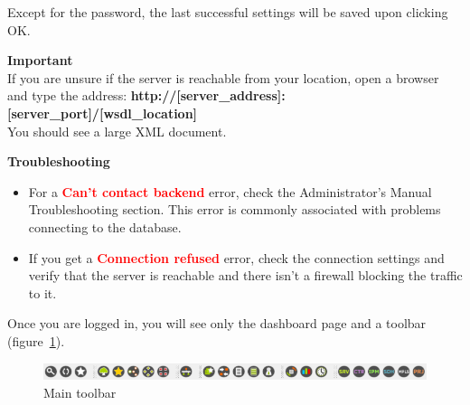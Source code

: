 \documentclass[a4paper]{article}
\begin{document}
	Except for the password, the last successful settings will be saved upon clicking OK.
	\begin{framed} {\large \textbf{Important}} \\
		If you are unsure if the server is reachable from your location, open a browser and type the address: \textbf{http://[server\_address]:[server\_port]/[wsdl\_location]}\\
		
		You should see a large XML document.
	\end{framed}
	\begin{framed} {\large \textbf{Troubleshooting}}
		\begin{itemize}
			\item For a \textbf{\textcolor{red}{Can't contact backend}} error, check the Administrator's Manual Troubleshooting section. This error is commonly associated with problems connecting to the database.
			\item If you get a \textbf{\textcolor{red}{Connection refused}} error, check the connection settings and verify that the server is reachable and there isn't a firewall blocking the traffic to it.
		\end{itemize}
	\end{framed} 
	Once you are logged in, you will see only the dashboard page and a toolbar (figure~\ref{fig:main_toolbar}).\\
	\begin{figure}[h!]
		\centering
		\includegraphics[width=0.7\linewidth]{img/main_toolbar.png}
		\caption{Main toolbar}
		\label{fig:main_toolbar}
	\end{figure}
	
\end{document}
